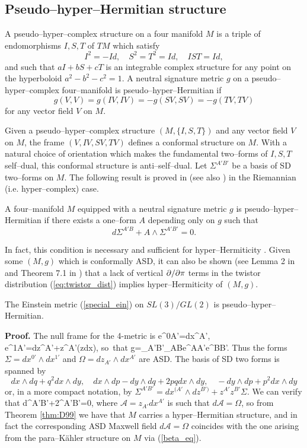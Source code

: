 \subsection{Pseudo--hyper--Hermitian structure}
A pseudo--hyper--complex structure on a four manifold $M$ is a triple of endomorphisms
$I, S, T$ of $TM$ which satisfy
\[
I^2=-Id, \quad S^2=T^2=Id, \quad IST=Id,
\]
and such that $aI+bS+cT$ is an integrable complex structure for any point 
on the hyperboloid $a^2-b^2-c^2=1$.
A neutral signature metric $g$ on a pseudo--hyper--complex four--manifold is pseudo--hyper--Hermitian
if
\[
g(V, V)=g(IV, IV)=-g(SV, SV)=-g(TV, TV)
\]
for any vector field $V$ on $M$.

Given a pseudo--hyper--complex structure $(M,\{I,S,T\})$ and any vector field $V$ on $M$, the frame $(V,IV,SV,TV)$ defines a conformal structure on $M$. With a natural choice of orientation
which makes the fundamental two--forms of $I, S, T$  self--dual, 
this conformal structure is anti--self--dual. 
Let $\Sigma^{A'B'}$ be a basis of SD two--forms on $M$. The following result is proved in \cite{D99} (see also \cite{boyer}) in the Riemannian (i.e. hyper--complex) case.
\begin{theo}[\cite{D99}]\label{thm:D99}
A four--manifold $M$ equipped with a neutral signature metric $g$ is pseudo--hyper--Hermitian if there exists a one--form $A$ depending only on $g$ such that
\[
d\Sigma^{A'B}+A\wedge \Sigma^{A'B'} = 0.
\]
\end{theo}
\noindent In fact, this condition is necessary and sufficient for hyper--Hermiticity \cite{D99,boyer}. Given some $(M,g)$ which is conformally ASD, it can also be shown (see Lemma 2 in \cite{D99} and Theorem  7.1 in \cite{Cal2}) that a lack of vertical $\partial/\partial \pi$ terms in the twistor distribution (\ref{eq:twistor_dist}) implies hyper--Hermiticity of $(M,g)$. 
\begin{prop}
\label{propHH}
The Einstein metric (\ref{special_ein}) on $SL(3)/GL(2)$ is pseudo--hyper--Hermitian.
\end{prop}
\noindent
{\bf Proof.}
The null frame for the 4-metric is
\be \label{eq:null_frame}
e^{0A'}=dx^{A'}, \quad e^{1A'}=dz^{A'}+z^{A'}(z\cdot dx), \quad\mbox{so that}\quad
g=\epsilon_{A'B'}\epsilon_{AB}e^{AA'}e^{BB'}.
\ee
Thus the forms $\Sigma=dx^{0'}\wedge dx^{1'}$ and $\Omega=dz_{A'}\wedge dx^{A'}$ are ASD. The basis of SD two forms is spanned by
\[
dx\wedge dq+ q^2 dx\wedge dy,\quad
dx\wedge dp-dy\wedge dq+2 pq dx\wedge dy,
\quad
-dy\wedge dp+ p^2 dx\wedge dy
\]
or, in a more compact notation, by
$\Sigma^{A'B'}=dx^{(A'}\wedge dz^{B')}+z^{A'}z^{B'} \Sigma$.
We can verify that
\be
\label{lie_form}
d\Sigma^{A'B'}+2{{}}\wedge\Sigma^{A'B'}=0,
\ee
where ${{\mathcal A}}= z_{A'}dx^{A'}$ is such that $d{{\mathcal{A}}}= \Omega$,
so from Theorem \ref{thm:D99} we have that $M$ carries a hyper--Hermitian structure, and in fact the corresponding ASD Maxwell field $d\mathcal{A}=\Omega$ coincides with the one arising from the para--K\"ahler structure on $M$ via (\ref{beta_eq}).

